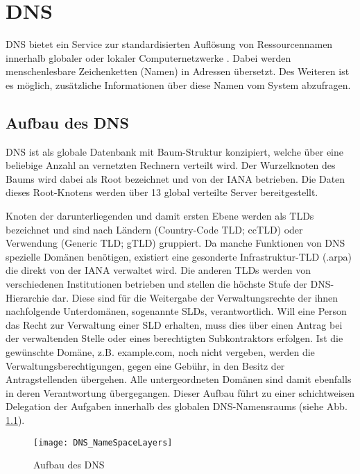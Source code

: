 \chapter{DNS}
\label{chap:dns}
DNS bietet ein Service zur standardisierten Auflösung von Ressourcennamen innerhalb globaler oder lokaler Computernetzwerke \cite{rfc1035}. Dabei werden menschenlesbare Zeichenketten (Namen) in Adressen übersetzt. Des Weiteren ist es möglich, zusätzliche Informationen über diese Namen vom System abzufragen.

\section{Aufbau des DNS}
DNS ist als globale Datenbank mit Baum-Struktur konzipiert, welche über eine beliebige Anzahl an vernetzten Rechnern verteilt wird. Der Wurzelknoten des Baums wird dabei als Root bezeichnet und von der \ac{IANA} betrieben. Die Daten dieses Root-Knotens werden über 13 global verteilte Server bereitgestellt. 

Knoten der darunterliegenden und damit ersten Ebene werden als \acp{TLD} bezeichnet und sind nach Ländern (Country-Code TLD; ccTLD) oder Verwendung (Generic TLD; gTLD) gruppiert. Da manche Funktionen von DNS spezielle Domänen benötigen, existiert eine gesonderte Infrastruktur-\ac{TLD} (.arpa) die direkt von der \ac{IANA} verwaltet wird. Die anderen TLDs werden von verschiedenen Institutionen betrieben und stellen die höchste Stufe der DNS-Hierarchie dar. Diese sind für die Weitergabe der Verwaltungsrechte der ihnen nachfolgende Unterdomänen, sogenannte \acp{SLD}, verantwortlich. Will eine Person das Recht zur Verwaltung einer \ac{SLD} erhalten, muss dies über einen Antrag bei der verwaltenden Stelle oder eines berechtigten Subkontraktors erfolgen. Ist die gewünschte Domäne, z.B. example.com, noch nicht vergeben, werden die Verwaltungsberechtigungen, gegen eine Gebühr, in den Besitz der Antragstellenden übergehen. Alle untergeordneten Domänen sind damit ebenfalls in deren Verantwortung übergegangen. Dieser Aufbau führt zu einer schichtweisen Delegation der Aufgaben innerhalb des globalen DNS-Namensraums (siehe Abb. \ref{img:dnsnamespace}). 

\begin{figure}[!hb]
    \centering
    \texttt{[image: DNS\_NameSpaceLayers]}
    \caption{Aufbau des DNS}
    \label{img:dnsnamespace}
\end{figure}

